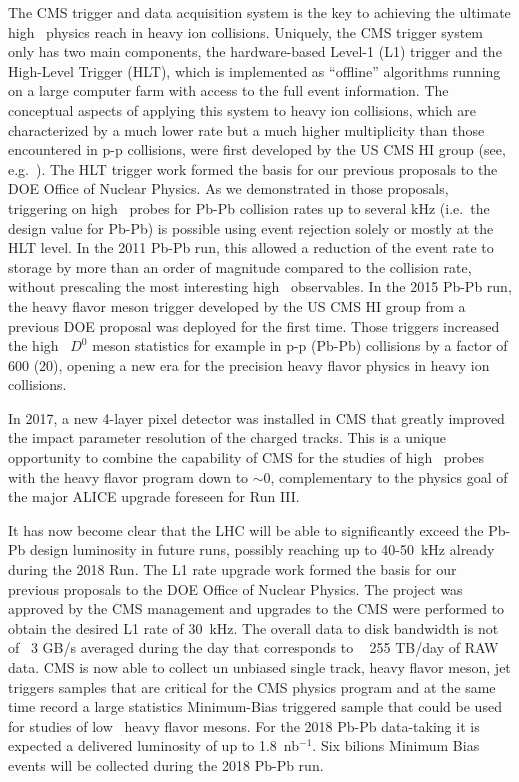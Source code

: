 The CMS trigger and data acquisition system is the key to achieving the ultimate high \pt\ physics reach in heavy ion collisions. Uniquely, the CMS trigger system only has two main components, the hardware-based Level-1 (L1) trigger and the High-Level Trigger (HLT), which is implemented as ``offline'' algorithms running on a large computer farm with access to the full event information.  
The conceptual aspects of applying this system to heavy ion collisions, which are characterized by a much lower rate but a much higher multiplicity than those encountered in p-p collisions, were first developed by the US CMS HI group (see, e.g.\ \cite{Roland:2007is}). The HLT trigger work formed the basis for our previous proposals to the DOE Office of Nuclear Physics. As we demonstrated in those proposals, triggering on high \pt\ probes for Pb-Pb collision rates up to several kHz (i.e.\ the design value for Pb-Pb) is possible using event rejection solely or mostly at the HLT level. In the 2011 Pb-Pb run, this allowed a reduction of the event rate to storage by more than an order of magnitude compared to the collision rate, without prescaling the most interesting high \pt\ observables. In the 2015 Pb-Pb run, the heavy flavor meson trigger developed by the US CMS HI group from a previous DOE proposal was deployed for the first time. Those triggers increased the high \pt\ $D^0$ meson statistics for example in p-p (Pb-Pb) collisions by a factor of 600 (20), opening a new era for the precision heavy flavor physics in heavy ion collisions.

In 2017, a new 4-layer pixel detector was installed in CMS that greatly improved the impact parameter resolution of the charged tracks. This is a unique opportunity to combine the capability of CMS for the studies of high \pt\ probes with the heavy flavor program down to \pt$\sim 0$, complementary to the physics goal of the major ALICE upgrade foreseen for Run III. 

It has now become clear that the LHC will be able to significantly exceed the Pb-Pb design luminosity in future runs, possibly reaching up to 40-50~kHz already during the 2018 Run.
The L1 rate upgrade work formed the basis for our previous proposals to the DOE Office of Nuclear Physics. The project was approved by the CMS management and upgrades to the CMS were performed to obtain the desired L1 rate of 30~kHz. The overall data to disk bandwidth is not of ~3 GB/s averaged during the day that corresponds to ~ 255 TB/day of RAW data.  CMS is now able to collect un unbiased single track, heavy flavor meson, jet triggers samples that are critical for the CMS physics program and at the same time record a large statistics Minimum-Bias triggered sample that could be used for studies of low \pt\ heavy flavor mesons. For the 2018 Pb-Pb data-taking it is expected a delivered luminosity of up to 1.8~nb$^{-1}$. Six bilions Minimum Bias events will be collected during the 2018 Pb-Pb run.   

